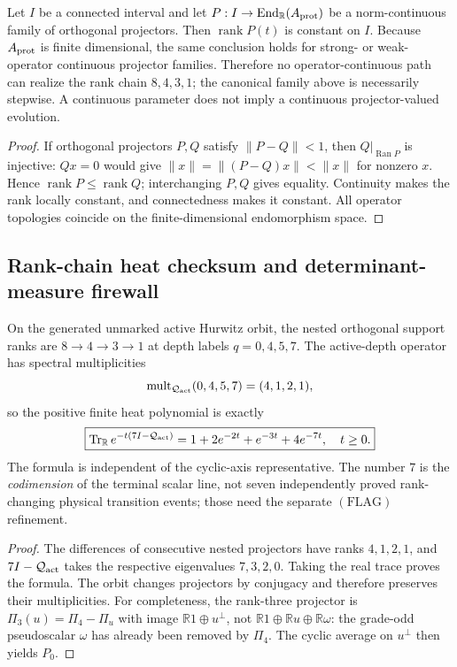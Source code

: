 \documentclass[12pt,a4paper]{article}
\begin{document}
\begin{corollary}
\label{p3c:cor:rank-changing-projector-continuity-no-go}
Let \(I\) be a connected interval and let
\(P:I\to\operatorname{End}_{\mathbb R}(A_{\rm prot})\) be a norm-continuous family of
orthogonal projectors.  Then \(\operatorname{rank}P(t)\) is constant on
\(I\).  Because \(A_{\rm prot}\) is finite dimensional, the same conclusion
holds for strong- or weak-operator continuous projector families.  Therefore
no operator-continuous path can realize the rank chain \(8,4,3,1\); the
canonical family above is necessarily stepwise.  A continuous parameter does
not imply a continuous projector-valued evolution.
\end{corollary}

\begin{proof}
If orthogonal projectors \(P,Q\) satisfy \(\|P-Q\|<1\), then
\(Q|_{\operatorname{Ran}P}\) is injective: \(Qx=0\) would give
\(\|x\|=\|(P-Q)x\|<\|x\|\) for nonzero \(x\).  Hence
\(\operatorname{rank}P\le\operatorname{rank}Q\); interchanging \(P,Q\)
gives equality.  Continuity makes the rank locally constant, and connectedness
makes it constant.  All operator topologies coincide on the finite-dimensional
endomorphism space.
\end{proof}

\subsection{Rank-chain heat checksum and determinant-measure firewall}
\label{p3c:sec:v346-rank-heat-check}
\begin{corollary}
\label{p3c:cor:v346-active-heat-checksum}
On the generated unmarked active Hurwitz orbit, the nested orthogonal
support ranks are $8\to4\to3\to1$ at depth labels $q=0,4,5,7$.
The active-depth operator has spectral multiplicities
\[
 \operatorname{mult}_{\mathcal Q_{\rm act}}(0,4,5,7)=(4,1,2,1),
\]
so the positive finite heat polynomial is exactly
\[
 \boxed{\operatorname{Tr}_{\mathbb R}
 e^{-t(7I-\mathcal Q_{\rm act})}
 =1+2e^{-2t}+e^{-3t}+4e^{-7t},\quad t\ge0.}
\]
The formula is independent of the cyclic-axis representative.  The
number $7$ is the \emph{codimension} of the terminal scalar line, not
seven independently proved rank-changing physical transition events;
those need the separate $(\mathrm{FLAG})$ refinement.
\end{corollary}
\begin{proof}
The differences of consecutive nested projectors have ranks $4,1,2,1$,
and $7I-\mathcal Q_{\rm act}$ takes the respective eigenvalues
$7,3,2,0$.  Taking the real trace proves the formula.  The orbit changes
projectors by conjugacy and therefore preserves their multiplicities.
For completeness, the rank-three projector is
$\Pi_3(u)=\Pi_4-\Pi_u$ with image
$\mathbb R1\oplus u^\perp$, not
$\mathbb R1\oplus\mathbb Ru\oplus\mathbb R\omega$:
the grade-odd pseudoscalar $\omega$ has already been removed by
$\Pi_4$.  The cyclic average on $u^\perp$ then yields $P_0$.
\end{proof}
\end{document}
